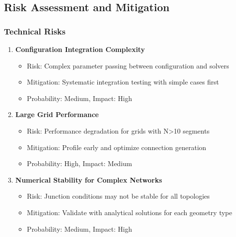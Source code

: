 \subsection{Risk Assessment and Mitigation}

\subsubsection{Technical Risks}
\begin{enumerate}
    \item \textbf{Configuration Integration Complexity}
    \begin{itemize}
        \item Risk: Complex parameter passing between configuration and solvers
        \item Mitigation: Systematic integration testing with simple cases first
        \item Probability: Medium, Impact: High
    \end{itemize}
    
    \item \textbf{Large Grid Performance}
    \begin{itemize}
        \item Risk: Performance degradation for grids with N>10 segments
        \item Mitigation: Profile early and optimize connection generation
        \item Probability: High, Impact: Medium
    \end{itemize}
    
    \item \textbf{Numerical Stability for Complex Networks}
    \begin{itemize}
        \item Risk: Junction conditions may not be stable for all topologies
        \item Mitigation: Validate with analytical solutions for each geometry type
        \item Probability: Medium, Impact: High
    \end{itemize}
\end{enumerate}

